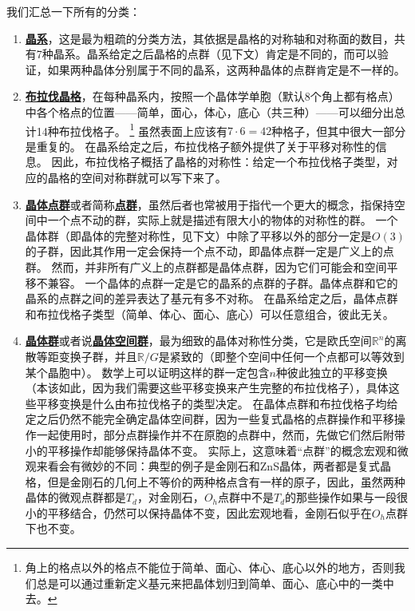 \documentclass[hyperref, UTF8, a4paper]{ctexart}
\newcommand*{\concept}[1]{\underline{\textbf{#1}}}
\begin{document}
我们汇总一下所有的分类：
\begin{enumerate}
    \item \concept{晶系}，这是最为粗疏的分类方法，其依据是晶格的对称轴和对称面的数目，共有7种晶系。晶系给定之后晶格的点群（见下文）肯定是不同的，而可以验证，如果两种晶体分别属于不同的晶系，这两种晶体的点群肯定是不一样的。
    \item \concept{布拉伐晶格}，在每种晶系内，按照一个晶体学单胞（默认8个角上都有格点）中各个格点的位置——简单，面心，体心，底心（共三种）——可以细分出总计14种布拉伐格子。%
    \footnote{
        角上的格点以外的格点不能位于简单、面心、体心、底心以外的地方，否则我们总是可以通过重新定义基元来把晶体划归到简单、面心、底心中的一类中去。
    }%
    虽然表面上应该有$7 \cdot 6 = 42$种格子，但其中很大一部分是重复的。
    在晶系给定之后，布拉伐格子额外提供了关于平移对称性的信息。
    因此，布拉伐格子概括了晶格的对称性：给定一个布拉伐格子类型，对应的晶格的空间对称群就可以写下来了。
    \item \concept{晶体点群}或者简称\concept{点群}，虽然后者也常被用于指代一个更大的概念，指保持空间中一个点不动的群，实际上就是描述有限大小的物体的对称性的群。
    一个晶体群（即晶体的完整对称性，见下文）中除了平移以外的部分一定是$O(3)$的子群，因此其作用一定会保持一个点不动，即晶体点群一定是广义上的点群。
    然而，并非所有广义上的点群都是晶体点群，因为它们可能会和空间平移不兼容。
    一个晶体的点群一定是它的晶系的点群的子群。晶体点群和它的晶系的点群之间的差异表达了基元有多不对称。
    在晶系给定之后，晶体点群和布拉伐格子类型（简单、体心、面心、底心）可以任意组合，彼此无关。
    \item \concept{晶体群}或者说\concept{晶体空间群}，最为细致的晶体对称性分类，它是欧氏空间$\mathbb{R}^n$的离散等距变换子群，并且$\mathbb{R} / G$是紧致的（即整个空间中任何一个点都可以等效到某个晶胞中）。
    数学上可以证明这样的群一定包含$n$种彼此独立的平移变换（本该如此，因为我们需要这些平移变换来产生完整的布拉伐格子），具体这些平移变换是什么由布拉伐格子的类型决定。
    在晶体点群和布拉伐格子均给定之后仍然不能完全确定晶体空间群，因为一些复式晶格的点群操作和平移操作一起使用时，部分点群操作并不在原胞的点群中，然而，先做它们然后附带小的平移操作却能够保持晶体不变。
    实际上，这意味着“点群”的概念宏观和微观来看会有微妙的不同：典型的例子是金刚石和ZnS晶体，两者都是复式晶格，但是金刚石的几何上不等价的两种格点含有一样的原子，因此，虽然两种晶体的微观点群都是$T_d$，对金刚石，$O_h$点群中不是$T_d$的那些操作如果与一段很小的平移结合，仍然可以保持晶体不变，因此宏观地看，金刚石似乎在$O_h$点群下也不变。
\end{enumerate}
\end{document}
